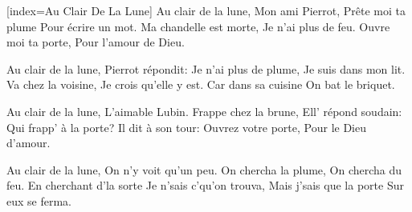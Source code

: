 [index={Au Clair De La Lune}]
\beginverse
Au clair de la lune,
Mon ami Pierrot,
Pr\^ete moi ta plume
Pour \'ecrire un mot.
Ma chandelle est morte,
Je n'ai plus de feu.
Ouvre moi ta porte,
Pour l'amour de Dieu.
\endverse

\beginverse
Au clair de la lune,
Pierrot r\'epondit:
Je n'ai plus de plume,
Je suis dans mon lit.
Va chez la voisine,
Je crois qu'elle y est.
Car dans sa cuisine
On bat le briquet.
\endverse

\beginverse
Au clair de la lune,
L'aimable Lubin.
Frappe chez la brune,
Ell' r\'epond soudain:
Qui frapp' à la porte?
Il dit à son tour:
Ouvrez votre porte,
Pour le Dieu d'amour.
\endverse

\beginverse
Au clair de la lune,
On n'y voit qu'un peu.
On chercha la plume,
On chercha du feu.
En cherchant d'la sorte
Je n'sais c'qu'on trouva,
Mais j'sais que la porte
Sur eux se ferma.
\endverse

\endsong